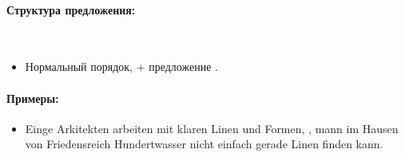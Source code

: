 \paragraph{Структура предложения:} ~\\
\begin{itemize}
\item Нормальный порядок,  + предложение \dverb{}.
\end{itemize}

\paragraph{Примеры:}
\begin{itemize}
    \item Einge Arkitekten arbeiten mit klaren Linen und Formen, , mann im Hausen von Friedensreich Hundertwasser nicht einfach gerade Linen finden kann.
          ~\\ 
\end{itemize}

